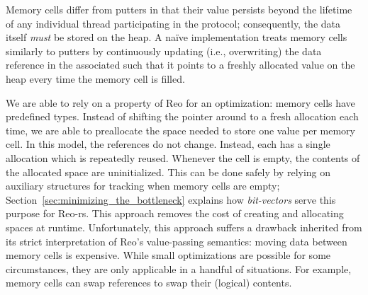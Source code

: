 Memory cells differ from putters in that their value persists beyond the lifetime of any individual thread participating in the protocol; consequently, the data itself \textit{must} be stored on the heap. A na\"ive implementation treats memory cells similarly to putters by continuously updating (i.e., overwriting) the data reference in the associated  such that it points to a freshly allocated value on the heap every time the memory cell is filled.

We are able to rely on a property of Reo for an optimization: memory cells have predefined types. Instead of shifting the pointer around to a fresh allocation each time, we are able to preallocate the space needed to store one value per memory cell. In this model, the references do not change. Instead, each has a single allocation which is repeatedly reused. Whenever the cell is empty, the contents of the allocated space are uninitialized. This can be done safely by relying on auxiliary structures for tracking when memory cells are empty; Section~\ref{sec:minimizing_the_bottleneck} explains how \textit{bit-vectors} serve this purpose for Reo-rs. This approach removes the cost of creating and allocating spaces at runtime. Unfortunately, this approach suffers a drawback inherited from its strict interpretation of Reo's value-passing semantics: moving data between memory cells is expensive. While small optimizations are possible for some circumstances, they are only applicable in a handful of situations. For example, memory cells can swap references to swap their (logical) contents.


